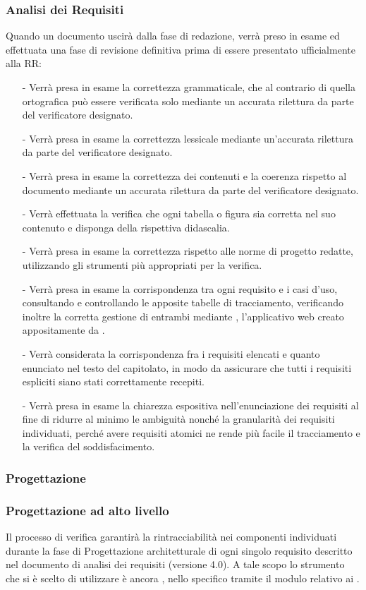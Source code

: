 \subsubsection{Analisi dei Requisiti}
Quando un documento uscirà dalla fase di redazione, verrà preso in esame ed effettuata una fase di revisione definitiva prima di essere presentato ufficialmente alla RR: 
\begin{itemize}
  \item[-] Verrà presa in esame la correttezza grammaticale, che al contrario di quella ortografica può essere verificata solo mediante un accurata rilettura da parte del verificatore designato.
  \item[-] Verrà presa in esame la correttezza lessicale mediante un'accurata rilettura da parte del verificatore designato.
  \item[-] Verrà presa in esame la correttezza dei contenuti e la coerenza rispetto al documento mediante un accurata rilettura da parte del verificatore designato.
  \item[-] Verrà effettuata la verifica che ogni tabella o figura sia corretta nel suo contenuto e disponga della rispettiva didascalia.
  \item[-] Verrà presa in esame la correttezza rispetto alle norme di progetto redatte, utilizzando gli strumenti più appropriati per la verifica.
  \item[-] Verrà presa in esame la corrispondenza tra ogni requisito e i casi d'uso, consultando e controllando le apposite tabelle di tracciamento, verificando inoltre la corretta gestione di entrambi mediante \manager, l'applicativo web creato appositamente da \team.
  \item[-] Verrà considerata la corrispondenza fra i requisiti elencati e quanto enunciato nel testo del capitolato, in modo da assicurare che tutti i requisiti espliciti siano stati correttamente recepiti.
  \item[-] Verrà presa in esame la chiarezza espositiva nell'enunciazione dei requisiti al fine di ridurre al minimo le ambiguità nonché la granularità dei requisiti individuati, perché avere requisiti atomici ne rende più facile il tracciamento e la verifica del soddisfacimento.
\end{itemize}

\subsubsection{Progettazione}

\subsubsection*{Progettazione ad alto livello}
Il processo di verifica garantirà la rintracciabilità nei componenti individuati durante la fase di Progettazione architetturale di ogni singolo requisito descritto nel documento di analisi dei requisiti (versione 4.0). A tale scopo lo strumento che si è scelto di utilizzare è ancora \manager, nello specifico tramite il modulo relativo ai .

